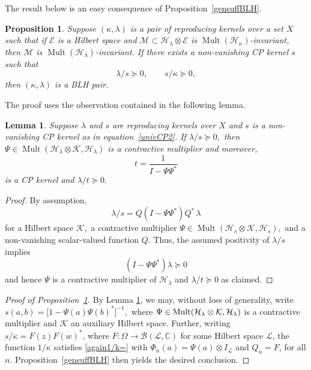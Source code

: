 \documentclass[a4paper,reqno,index]{amsart}
\numberwithin{equation}{section}
\newtheorem{lemma}[theorem]{Lemma}
\newcommand{\CC}{\mathbb{C}}
\newcommand{\Mult}{\operatorname{Mult}}
\newcommand{\cH}{\mathcal{H}}
\newcommand{\HSE}{\mathcal{E}}
\newcommand{\genk}{\kappa} %
\newcommand{\genl}{\lambda} %
\newtheorem{proposition}[theorem]{Proposition}
\theoremstyle{definition}
\begin{document}
The result below is an easy consequence of Proposition~\ref{gensuffBLH}.


\begin{proposition}\label{CPinbetween}
  Suppose  $(\genk, \genl)$ is a pair of  reproducing kernels
 over a set $X$ such that 
 if  $\HSE$ is a Hilbert space and $\mathcal{M}\subset\mathcal{H}_{\genl}\otimes\mathcal{E}$ is $\Mult(\cH_\genk)$-invariant, then $\mathcal{M} $ is 
 $\Mult(\cH_\genl)$-invariant. 
 If there exists a non-vanishing CP kernel $s$ such that 
 \[\genl/s\succeq 0, \qquad  s/\genk\succeq 0,\]
then $(\genk, \genl)$ is a BLH pair.
\end{proposition}


The proof uses the observation contained in the following lemma.

\begin{lemma}
    \label{l:l/s}
      Suppose  $\genl$ and $s$ are reproducing kernels over $X$
      and $s$ is a non-vanishing CP kernel as in equation~\eqref{univCP2}. If $\genl/s\succeq 0,$  then $\Psi\in \Mult(\cH_\genl\otimes \mathcal{K},\cH_\genl)$ 
      is a contractive multiplier and moreover,
    \[
       t=\frac{1}{I-\Psi \Psi^*}
    \]
     is a CP kernel and $\genl/t\succeq 0.$
\end{lemma}

\begin{proof}
 By assumption, 
\[
  \genl/s = Q(I-\Psi\Psi^*) Q^* \, \genl
\]
 for a Hilbert space $\mathcal{K},$ a contractive multiplier $\Psi\in \Mult(\cH_s\otimes \mathcal{K}, \mathcal{H}_s),$ and  a
 non-vanishing scalar-valued function $Q.$ Thus, the assumed
 positivity of $\genl/s$ implies
\[
  (I-\Psi \Psi^*) \genl\succeq 0
\]
 and hence $\Psi$ is a contractive multiplier of $\mathcal{H}_{\genl}$ and $\genl/t\succeq0$
 as claimed.
\end{proof}


 
\begin{proof}[Proof of Proposition~\ref{CPinbetween}]
By Lemma \ref{l:l/s},  we may, without loss of generality, write $s(a, b)=\big[1-\Psi(a)\Psi(b)^*\big]^{-1},$
 where $\Psi\in\textup{Mult}(\mathcal{H}_{\genl}\otimes \mathcal{K},\mathcal{H}_{\genl} )$ is a contractive multiplier and $\mathcal{K}$ an auxiliary Hilbert space.  Further, writing $s/\genk=F(z)F(w)^*$, where $F:\Omega\to \mathcal{B}(\mathcal{L}, \CC) $ for some Hilbert space $\mathcal{L}$, the function $1/\genk$ satisfies \eqref{again1/k=} with $\Phi_n(a)=\Psi(a)\otimes I_{\mathcal{L}}$ and $Q_n=F$, for all $n$. Proposition~\ref{gensuffBLH} then yields the desired conclusion.
\end{proof}
\end{document}
